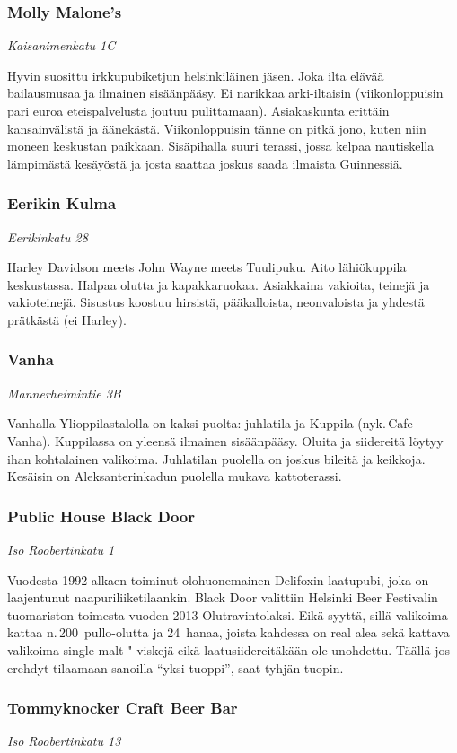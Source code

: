 \documentclass[../ala_hataile.tex]{subfiles}
\begin{document}
\subsubsection*{Molly Malone's}
\textit{Kaisanimenkatu 1C}

Hyvin suosittu irkkupubiketjun helsinkiläinen
jäsen. Joka ilta elävää bailausmusaa
ja ilmainen sisäänpääsy. Ei narikkaa arki-iltaisin
(viikonloppuisin pari euroa eteispalvelusta
joutuu pulittamaan). Asiakaskunta
erittäin kansainvälistä ja äänekästä.
Viikonloppuisin tänne on pitkä jono, kuten niin moneen keskustan paikkaan. Sisäpihalla suuri terassi, jossa kelpaa nautiskella lämpimästä kesäyöstä ja josta saattaa joskus saada ilmaista Guinnessiä.
\subsubsection*{Eerikin Kulma}
\textit{Eerikinkatu 28}

Harley Davidson meets John Wayne
meets Tuulipuku. Aito lähiökuppila keskustassa.
Halpaa olutta ja kapakkaruokaa.
Asiakkaina vakioita, teinejä ja vakioteinejä.
Sisustus koostuu hirsistä, pääkalloista,
neonvaloista ja yhdestä prätkästä (ei Harley).
\subsubsection*{Vanha}
\textit{Mannerheimintie 3B}

Vanhalla Ylioppilastalolla on kaksi
puolta: juhlatila ja Kuppila (nyk.\,Cafe
Vanha). Kuppilassa on yleensä ilmainen
sisäänpääsy. Oluita ja siidereitä löytyy ihan
kohtalainen valikoima. Juhlatilan puolella
on joskus bileitä ja keikkoja. Kesäisin on
Aleksanterinkadun puolella mukava kattoterassi.
\subsubsection*{Public House Black Door}
\textit{Iso Roobertinkatu 1}

Vuodesta 1992 alkaen toiminut olohuonemainen
Delifoxin laatupubi, joka on laajentunut
naapuriliiketilaankin. Black Door
valittiin Helsinki Beer Festivalin tuomariston
toimesta vuoden 2013 Olutravintolaksi.
Eikä syyttä, sillä valikoima kattaa n.\,200~pullo-olutta ja 24~hanaa, joista kahdessa on
real alea sekä kattava valikoima single malt
"-viskejä eikä laatusiidereitäkään ole unohdettu.
Täällä jos erehdyt tilaamaan sanoilla
``yksi tuoppi'', saat tyhjän tuopin.
\subsubsection*{Tommyknocker Craft Beer Bar}
\textit{Iso Roobertinkatu 13}
\end{document}
